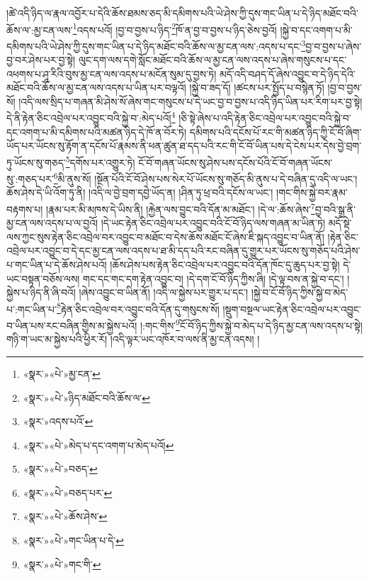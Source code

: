 །ཚེ་འདི་ཉིད་ལ་རྣལ་འབྱོར་པ་དེའི་ཆོས་ཐམས་ཅད་མི་དམིགས་པའི་ཡེ་ཤེས་ཀྱི་དུས་གང་ཡིན་པ་དེ་ཉིད་མཐོང་བའི་ཆོས་ལ་:མྱ་ངན་ལས་\footnote{«སྣར་»«པེ་»མྱ་ངན་}འདས་པའོ། །བྱ་བ་བྱས་པ་ཉིད་\footnote{«སྣར་»«པེ་»ཉིད་མཐོང་བའི་ཆོས་ལ་}ཁོ་ན་བྱ་བ་བྱས་པ་ཉིད་ཅེས་བྱའོ། །སྐྱེ་བ་དང་འགག་པ་མི་དམིགས་པའི་ཡེ་ཤེས་ཀྱི་དུས་གང་ཡིན་པ་དེ་ཉིད་མཐོང་བའི་ཆོས་ལ་མྱ་ངན་ལས་:འདས་པ་དང་\footnote{«སྣར་»འདས་པའོ་}བྱ་བ་བྱས་པ་ཞེས་བྱ་བར་ཤེས་པར་བྱ་སྟེ། ལུང་དག་ལས་དགེ་སློང་མཐོང་བའི་ཆོས་ལ་མྱ་ངན་ལས་འདས་པ་ཞེས་གསུངས་པ་དང་འཕགས་པ་ཤཱ་རིའི་བུས་མྱ་ངན་ལས་འདས་པ་མངོན་སུམ་དུ་བྱས་ཏེ། མདོ་འདི་བཤད་དོ་ཞེས་འབྱུང་བ་དེ་ཉིད་དེའི་མཐོང་བའི་ཆོས་ལ་མྱ་ངན་ལས་འདས་པ་ཡིན་པར་བལྟའོ། །སྐྱེ་བ་ཟད་དོ། །ཚངས་པར་སྤྱོད་པ་བསྙེན་ཏོ། །བྱ་བ་བྱས་སོ། །འདི་ལས་སྲིད་པ་གཞན་མི་ཤེས་སོ་ཞེས་གང་གསུངས་པ་དེ་ཡང་བྱ་བ་བྱས་པ་འདི་ཉིད་ཡིན་པར་རིག་པར་བྱ་སྟེ། དེ་ནི་རྟེན་ཅིང་འབྲེལ་པར་འབྱུང་བའི་སྐྱེ་བ་:མེད་པའོ།\footnote{«སྣར་»«པེ་»མེད་པ་དང་འགག་པ་མེད་པའོ།} །ཅི་སྟེ་ཞེས་པ་འདི་རྟེན་ཅིང་འབྲེལ་པར་འབྱུང་བའི་སྐྱེ་བ་དང་འགག་པ་མི་དམིགས་པའི་མཚན་ཉིད་དེ་ཁོ་ན་བོར་ཏེ། དམིགས་པའི་དངོས་པོ་རང་གི་མཚན་ཉིད་ཀྱི་ངོ་བོ་ཞིག་ཡོད་པར་ཡོངས་སུ་རྟོག་ན་དངོས་པོ་རྣམས་ནི་ཕན་ཚུན་ཐ་དད་པའི་རང་གི་ངོ་བོ་ཡིན་པས་དེ་ངེས་པར་དེས་བྱེ་བྲག་ཏུ་ཡོངས་སུ་གཅད་\footnote{«སྣར་»«པེ་»བཅད་}དགོས་པར་འགྱུར་ཏེ། ངོ་བོ་གཞན་ཡོངས་སུ་ཤེས་པས་དངོས་པོའི་ངོ་བོ་གཞན་ཡོངས་སུ་:གཅད་པར་\footnote{«སྣར་»«པེ་»བཅད་པར་}མི་ནུས་སོ། །སྔོན་པོའི་ངོ་བོ་ཤེས་པས་སེར་པོ་ཡོངས་སུ་གཅོད་མི་ནུས་པ་དེ་བཞིན་དུ་འདི་ལ་ཡང་། ཆོས་ཤེས་དེ་ཡི་འོག་ཏུ་ནི། །འདི་ལ་བྱེ་བྲག་དབྱེ་ཡོད་ན། །ཤིན་ཏུ་ཕྲ་བའི་དངོས་ལ་ཡང་། །གང་གིས་སྐྱེ་བར་རྣམ་བརྟགས་པ། །རྣམ་པར་མི་མཁས་དེ་ཡིས་ནི། །རྐྱེན་ལས་བྱུང་བའི་དོན་མ་མཐོང་། །དེ་ལ་:ཆོས་ཞེས་\footnote{«སྣར་»«པེ་»ཆོས་ཤེས་}བྱ་བའི་སྒྲ་ནི་མྱ་ངན་ལས་འདས་པ་ལ་བྱའོ། །དེ་ཡང་རྟེན་ཅིང་འབྲེལ་པར་འབྱུང་བའི་ངོ་བོ་ཉིད་ལས་གཞན་མ་ཡིན་ཏེ། མདོ་སྡེ་ལས་ཀྱང་སུས་རྟེན་ཅིང་འབྲེལ་བར་འབྱུང་བ་མཐོང་བ་དེས་ཆོས་མཐོང་ངོ་ཞེས་ཇི་སྐད་འབྱུང་བ་ཡིན་ནོ། །རྟེན་ཅིང་འབྲེལ་པར་འབྱུང་བ་དེ་དང་མྱ་ངན་ལས་འདས་པ་ཐ་མི་དད་པའི་རང་བཞིན་དུ་གྱུར་པར་ཡོངས་སུ་གཅོད་པའི་ཤེས་པ་གང་ཡིན་པ་དེ་ཆོས་ཤེས་པའོ། །ཆོས་ཤེས་པས་རྟེན་ཅིང་འབྲེལ་པར་འབྱུང་བའི་དོན་ཁོང་དུ་ཆུད་པར་བྱ་སྟེ། དེ་ཡང་བསྟན་བཅོས་ལས། གང་དང་གང་དག་རྟེན་འབྱུང་བ། །དེ་དག་ངོ་བོ་ཉིད་ཀྱིས་ཞི། །དེ་ལྟ་བས་ན་སྐྱེ་བ་དང་། །སྐྱེས་པ་ཉིད་ནི་ཞི་བའོ། །ཞེས་འབྱུང་བ་ཡིན་ནོ། །འདི་ལ་སྐྱེས་པར་གྱུར་པ་དང་། །སྐྱེ་བ་ངོ་བོ་ཉིད་ཀྱིས་སྐྱེ་བ་མེད་པ་:གང་ཡིན་པ་\footnote{«སྣར་»«པེ་»གང་ཡིན་པ་དེ་}རྟེན་ཅིང་འབྲེལ་བར་འབྱུང་བའི་དོན་དུ་གསུངས་སོ། །སྡུག་བསྔལ་ཡང་རྟེན་ཅིང་འབྲེལ་པར་འབྱུང་བ་ཡིན་པས་རང་བཞིན་གྱིས་མ་སྐྱེས་པའོ། །:གང་གིས་\footnote{«སྣར་»«པེ་»གང་གི་}ངོ་བོ་ཉིད་ཀྱིས་སྐྱེ་བ་མེད་པ་དེ་ཉིད་མྱ་ངན་ལས་འདས་པ་སྟེ། གཉི་ག་ཡང་མ་སྐྱེས་པའི་ཕྱིར་རོ། །འདི་ལྟར་ཡང་འཁོར་བ་ལས་ནི་མྱ་ངན་འདས། །
